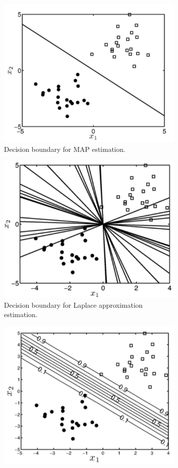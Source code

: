 \documentclass[12pt, letterpaper]{article}
\theoremstyle{definition}
\begin{document}
\begin{figure}
\begin{subfigure}[t]{0.5\textwidth}
\centering
\includegraphics[width=0.85\linewidth]{img/MAP1}
\caption{Decision boundary for MAP estimation.}
\label{MAP1}
\end{subfigure}
\hfill
\begin{subfigure}[t]{0.505\textwidth}
\centering
\includegraphics[width=0.8\linewidth]{img/laplace1}
\caption{Decision boundary for Laplace approximation estimation.}
\label{laplace1}
\end{subfigure}
\begin{subfigure}[t]{0.5\textwidth}
\centering
\includegraphics[width=0.8\linewidth]{img/MAP2}

\end{subfigure}
\end{figure}
\end{document}
